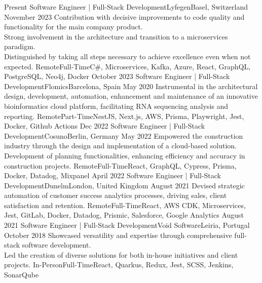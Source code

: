 %
%
%
\vspace{0.5em}
\begin{experiences}
  \experience
  {Present} {Software Engineer | Full-Stack Development}{Lyfegen}{Basel, Switzerland}
  {November 2023}    {Contribution with decisive improvements to code quality and functionality for the main company product.\\
  Strong involvement in the architecture and transition to a microservices paradigm.\\
  Distinguished by taking all steps necessary to achieve excellence even when not expected.}
  {Remote}{Full-Time}{C\#, Microservices, Kafka, Azure, React, GraphQL, PostgreSQL, Neo4j, Docker} 
  \emptySeparator
  \experience
  {October 2023} {Software Engineer | Full-Stack Development}{Flomics}{Barcelona, Spain}
  {May 2020}    {Instrumental in the architectural design, development, automation, enhancement and maintenance of an 
  innovative bioinformatics cloud platform, facilitating RNA sequencing analysis and reporting.}
  {Remote}{Part-Time}{NestJS, Next.js, AWS, Prisma, Playwright, Jest, Docker, Github Actions}
  \emptySeparator
  \experience
  {Dec 2022} {Software Engineer | Full-Stack Development}{Cosuno}{Berlin, Germany}
  {May 2022} {Empowered the construction industry through the design and implementation of a cloud-based 
  solution.\\
  Development of planning functionalities, enhancing efficiency 
  and accuracy in construction projects.}
  {Remote}{Full-Time}{React, GraphQL, Cypress, Prisma, Docker, Datadog, Mixpanel}
  \emptySeparator
  \experience
  {April 2022}   {Software Engineer | Full-Stack Development}{Dunelm}{London, United Kingdom}
  {August 2021} {Devised strategic automation of customer success analytics processes, driving sales,
  client satisfaction and retention.}
  {Remote}{Full-Time}{React,  AWS CDK, Microservices, Jest, GitLab, Docker, Datadog, Prismic, Salesforce, Google Analytics}
  \emptySeparator
  \experience
  {August 2021}     {Software Engineer | Full-Stack Development}{Void Software}{Leiria, Portugal}
  {October 2018}    {Showcased versatility and expertise through comprehensive full-stack software development.\\
  Led the creation of diverse solutions for both in-house initiatives and client projects.}
  {In-Person}{Full-Time}{React, Quarkus, Redux, Jest, SCSS, Jenkins, SonarQube}
\end{experiences}